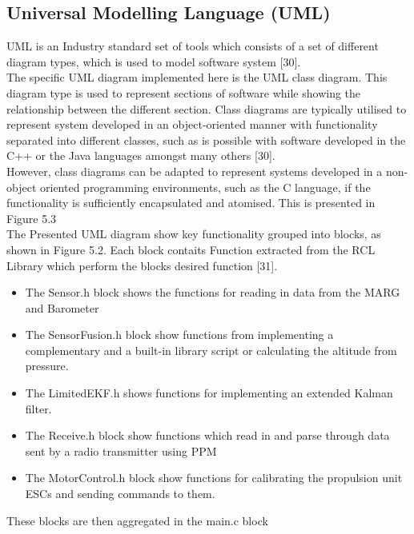 \documentclass[12pt,a4paper,twoside]{report}
\begin{document}
			\subsection{Universal Modelling Language (UML)}
			
				UML is an Industry standard set of tools which consists of a set of different diagram types, which is used to model software system [30].
				\\
				The specific UML diagram implemented here is the UML class diagram. This diagram type is used to represent sections of software while showing the relationship between the different section. Class diagrams are typically utilised to represent system developed in an object-oriented manner with functionality separated into different classes, such as is possible with software developed in the C++ or the Java languages amongst many others [30]. 
				\\
				However, class diagrams can be adapted to represent systems developed in a non-object oriented programming environments, such as the C language, if the functionality is sufficiently encapsulated and atomised. This is presented in Figure 5.3
				\\
				The Presented UML diagram show key functionality grouped into blocks, as shown in Figure 5.2. Each block contaits Function extracted from the RCL Library which perform the blocks desired function [31].
				\\
				\begin{itemize}
					
					\item 
						The Sensor.h block shows the functions for reading in data from the MARG and Barometer
					\item 
						The SensorFusion.h block show functions from implementing a complementary and a built-in library script or calculating the altitude from pressure.
					\item
						The LimitedEKF.h shows functions for implementing an extended Kalman filter.
					\item
						The Receive.h block show functions which read in and parse through data sent by a radio transmitter using PPM
					\item
						The MotorControl.h block show functions for calibrating the propulsion unit ESCs and sending commands to them.
				\end{itemize}
			
				These blocks are then aggregated in the main.c block
				\\
				
\end{document}
